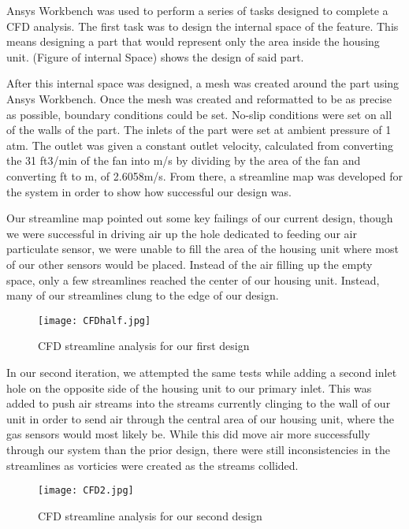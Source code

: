 Ansys Workbench was used to perform a series of tasks designed to complete a CFD analysis. The first task was to design the internal space of the feature. This means designing a part that would represent only the area inside the housing unit. (Figure of internal Space) shows the design of said part.

After this internal space was designed, a mesh was created around the part using Ansys Workbench. Once the mesh was created and reformatted to be as precise as possible, boundary conditions could be set. No-slip conditions were set on all of the walls of the part. The inlets of the part were set at ambient pressure of 1 atm. The outlet was given a constant outlet velocity, calculated from converting the 31 ft3/min of the fan into m/s by dividing by the area of the fan and converting ft to m, of 2.6058m/s. From there, a streamline map was developed for the system in order to show how successful our design was.

Our streamline map pointed out some key failings of our current design, though we were successful in driving air up the hole dedicated to feeding our air particulate sensor, we were unable to fill the area of the housing unit where most of our other sensors would be placed. Instead of the air filling up the empty space, only a few streamlines reached the center of our housing unit. Instead, many of our streamlines clung to the edge of our design.

\begin{figure}[H]
	\centering
	\texttt{[image: CFDhalf.jpg]}
	\caption{CFD streamline analysis for our first design}
	\label{fig:CFD1}
\end{figure}

In our second iteration, we attempted the same tests while adding a second inlet hole on the opposite side of the housing unit to our primary inlet. This was added to push air streams into the streams currently clinging to the wall of our unit in order to send air through the central area of our housing unit, where the gas sensors would most likely be. While this did move air more successfully through our system than the prior design, there were still inconsistencies in the streamlines as vorticies were created as the streams collided.

\begin{figure}[H]
	\centering
	\texttt{[image: CFD2.jpg]}
	\caption{CFD streamline analysis for our second design}
	\label{fig:CFD2}
\end{figure}

